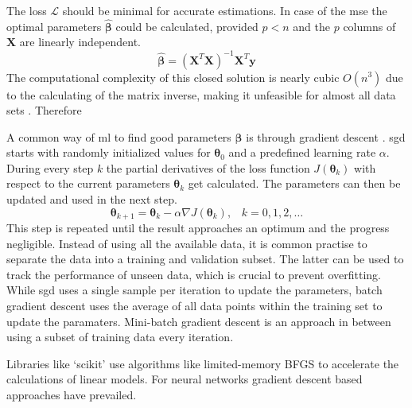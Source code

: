 The loss $\mathcal{L}$ should be minimal for accurate estimations. In case of the \gls{mse} the optimal parameters $\boldsymbol{\hat{\beta}}$ could be calculated, provided $p < n$ and the $p$ columns of $\mathbf{X}$ are linearly independent.
\begin{equation}
    \boldsymbol{\hat{\beta}} = (\mathbf{X}^T\mathbf{X})^{-1}\mathbf{X}^{T}\mathbf{y}
\end{equation}
The computational complexity of this closed solution is nearly cubic $O(n^3)$ due to the calculating of the matrix inverse, making it unfeasible for almost all data sets \autocite{riahi2023}. Therefore   

A common way of \gls{ml} to find good parameters $\boldsymbol{\beta}$ is through gradient descent \autocite{robbins1951}. 
\gls{sgd} starts with randomly initialized values for $\boldsymbol{\theta}_0$ and a predefined learning rate $\alpha$. 
During every step $k$ the partial derivatives of the loss function $J(\boldsymbol{\theta}_k)$ with respect to the current parameters $\boldsymbol{\theta}_k$ get calculated. The parameters can then be updated and used in the next step.
\begin{equation}
    \boldsymbol{\theta}_{k+1} = \boldsymbol{\theta}_k - \alpha\nabla J(\boldsymbol{\theta}_k)\text{,}\quad k=0,1,2,\ldots
\end{equation}
This step is repeated until the result approaches an optimum and the progress negligible. Instead of using all the available data, it is common practise to separate the data into a training and validation subset. The latter can be used to track the performance of unseen data, which is crucial to prevent overfitting. While \gls{sgd} uses a single sample per iteration to update the parameters, batch gradient descent uses the average of all data points within the training set to update the paramaters. Mini-batch gradient descent is an approach in between using a subset of training data every iteration. 



Libraries like `scikit' use algorithms like limited-memory BFGS to accelerate the calculations of linear models. For neural networks gradient descent based approaches have prevailed.


